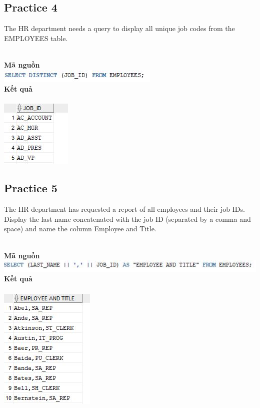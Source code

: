 \documentclass[12pt,a4paper]{report}
\begin{document}
\subsection{Practice 4}
\begin{boxedminipage}[t]{15.5cm}
	The HR department needs a query to display all unique job codes from the EMPLOYEES table.
\end{boxedminipage}
\newline
\\
\textbf{Mã nguồn}
\\
\newline
\includegraphics[scale=1]{44.jpg}\\
\textbf{Kết quả}\\\\
\includegraphics[scale=1]{k44.jpg}

\subsection{Practice 5}
\begin{boxedminipage}[t]{15.5cm}
	The HR department has requested a report of all employees and their job IDs. 
	Display the last name concatenated with the job ID (separated by a comma and space) 
	and name the column Employee and Title.
\end{boxedminipage}
\newline
\\
\textbf{Mã nguồn}
\\
\newline
\includegraphics[scale=1]{54.jpg}\\
\textbf{Kết quả}\\\\
\includegraphics[scale=1]{k54.jpg}
\end{document}
